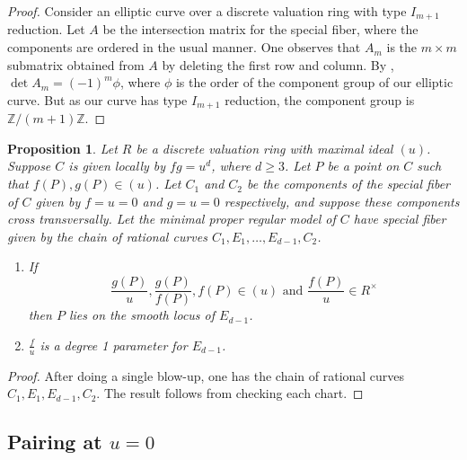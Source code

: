 \documentclass[reqno]{amsart}
\newtheorem{proposition}[thm]{Proposition}
\theoremstyle{definition}
\theoremstyle{remark}
\def\Z{\mathbb{Z}}
\begin{document}
\begin{proof}
  Consider an elliptic curve over a discrete valuation ring with type $I_{m+1}$ reduction. Let $A$ be the intersection matrix for the special fiber, where the components are ordered in the usual manner. One observes that $A_m$ is the $m \times m$ submatrix obtained from $A$ by deleting the first row and column. By \cite[Corollary~1.3]{lorenzini}, $\det A_m = (-1)^m \phi$, where $\phi$ is the order of the component group of our elliptic curve. But as our curve has type $I_{m+1}$ reduction, the component group is $\Z/(m+1)\Z$.
\end{proof}

\begin{proposition}\label{prop:fg-equals-u-blow-up}
  Let $R$ be a discrete valuation ring with maximal ideal $(u)$. Suppose $C$ is given locally by $fg = u^d$, where $d \geq 3$. Let $P$ be a point on $C$ such that $f(P), g(P) \in (u)$. Let $C_1$ and $C_2$ be the components of the special fiber of $C$ given by $f = u = 0$ and $g = u = 0$ respectively, and suppose these components cross transversally. Let the minimal proper regular model of $C$ have special fiber given by the chain of rational curves $C_1, E_1, \dots, E_{d-1}, C_2$.
  \begin{enumerate}
      \item  If
  \[
  \frac{g(P)}{u}, \frac{g(P)}{f(P)}, f(P) \in (u) \text{ and } \frac{f(P)}{u} \in R^\times
  \]
  then $P$ lies on the smooth locus of $E_{d-1}$.
    \item $\frac{f}{u}$ is a degree 1 parameter for $E_{d-1}$.
  \end{enumerate}
\end{proposition}

\begin{proof}
  After doing a single blow-up, one has the chain of rational curves $C_1, E_1, E_{d-1}, C_2$. The result follows from checking each chart.
\end{proof}

\subsection{Pairing at $u = 0$}
\label{sec:pairing-at-u}
\end{document}
